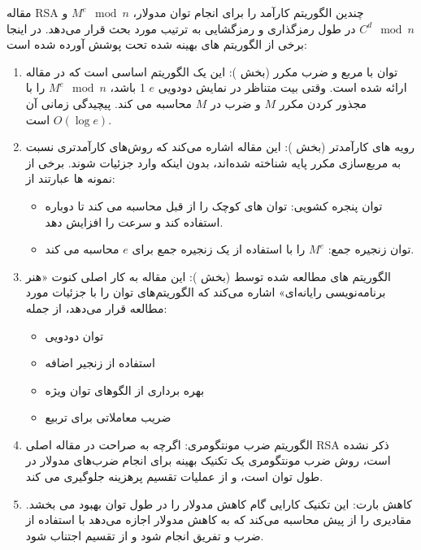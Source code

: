 \documentclass{report}
\begin{document}
مقاله RSA چندین الگوریتم کارآمد را برای انجام توان مدولار، \(M^e \mod n\) و \(C^d \mod n\) در طول رمزگذاری و رمزگشایی به ترتیب مورد بحث قرار می‌دهد. در اینجا برخی از الگوریتم های بهینه شده تحت پوشش آورده شده است:

\begin{enumerate}
    \item
    توان با مربع و ضرب مکرر (بخش ):
    این یک الگوریتم اساسی است که در مقاله ارائه شده است. وقتی بیت متناظر در نمایش دودویی \(e\) 1 باشد، \(M^e \mod n\) را با مجذور کردن مکرر \(M\) و ضرب در \(M\) محاسبه می کند. پیچیدگی زمانی آن \(O(\log e)\) است.
    
    \item 
    رویه های کارآمدتر (بخش ):
    این مقاله اشاره می‌کند که روش‌های کارآمدتری نسبت به مربع‌سازی مکرر پایه شناخته شده‌اند، بدون اینکه وارد جزئیات شوند. برخی از نمونه ها عبارتند از:
    \begin{itemize}
        \item
            توان پنجره کشویی: توان های کوچک را از قبل محاسبه می کند تا دوباره استفاده کند و سرعت را افزایش دهد.
        \item 
            توان زنجیره جمع: \(M^e\) را با استفاده از یک زنجیره جمع برای \(e\) محاسبه می کند.
    \end{itemize}

    \item 
    الگوریتم های مطالعه شده توسط  (بخش ):
    این مقاله به کار اصلی کنوت «هنر برنامه‌نویسی رایانه‌ای» اشاره می‌کند که الگوریتم‌های توان را با جزئیات مورد مطالعه قرار می‌دهد، از جمله:
    \begin{itemize}
        \item
        توان دودویی
        \item 
        استفاده از زنجیر اضافه
        \item 
        بهره برداری از الگوهای توان ویژه
        \item 
        ضریب معاملاتی برای تربیع
    \end{itemize}

    \item 
    الگوریتم ضرب مونتگومری:
    اگرچه به صراحت در مقاله اصلی RSA ذکر نشده است، روش ضرب مونتگومری یک تکنیک بهینه برای انجام ضرب‌های مدولار در طول توان است، و از عملیات تقسیم پرهزینه جلوگیری می کند.

    \item 
    کاهش بارت:
    این تکنیک کارایی گام کاهش مدولار را در طول توان بهبود می بخشد. مقادیری را از پیش محاسبه می‌کند که به کاهش مدولار اجازه می‌دهد با استفاده از ضرب و تفریق انجام شود و از تقسیم اجتناب شود.
\end{enumerate}
\end{document}
